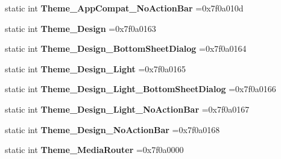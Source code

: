 \begin{DoxyCompactItemize}
static int {\bfseries Theme\+\_\+\+App\+Compat\+\_\+\+No\+Action\+Bar} =0x7f0a010d
\item 
\mbox{\label{classandroid_1_1support_1_1v7_1_1mediarouter_1_1R_1_1style_a616fa0375b1181ab8742cbd2d86d3fe4}} 
static int {\bfseries Theme\+\_\+\+Design} =0x7f0a0163
\item 
\mbox{\label{classandroid_1_1support_1_1v7_1_1mediarouter_1_1R_1_1style_ae04bf3236e19d1abda54c1583a8bc4ea}} 
static int {\bfseries Theme\+\_\+\+Design\+\_\+\+Bottom\+Sheet\+Dialog} =0x7f0a0164
\item 
\mbox{\label{classandroid_1_1support_1_1v7_1_1mediarouter_1_1R_1_1style_a6d96e10781426f8f3e4dc43d48a12cdd}} 
static int {\bfseries Theme\+\_\+\+Design\+\_\+\+Light} =0x7f0a0165
\item 
\mbox{\label{classandroid_1_1support_1_1v7_1_1mediarouter_1_1R_1_1style_aca2b6216f77338f7abd9853734c5081f}} 
static int {\bfseries Theme\+\_\+\+Design\+\_\+\+Light\+\_\+\+Bottom\+Sheet\+Dialog} =0x7f0a0166
\item 
\mbox{\label{classandroid_1_1support_1_1v7_1_1mediarouter_1_1R_1_1style_af98cf7abebb0b451ecc74d268e70dba8}} 
static int {\bfseries Theme\+\_\+\+Design\+\_\+\+Light\+\_\+\+No\+Action\+Bar} =0x7f0a0167
\item 
\mbox{\label{classandroid_1_1support_1_1v7_1_1mediarouter_1_1R_1_1style_afa115a9b4c6de56dee8287642b3482fe}} 
static int {\bfseries Theme\+\_\+\+Design\+\_\+\+No\+Action\+Bar} =0x7f0a0168
\item 
\mbox{\label{classandroid_1_1support_1_1v7_1_1mediarouter_1_1R_1_1style_a27131030e20637f2c38b6d78c3801fea}} 
static int {\bfseries Theme\+\_\+\+Media\+Router} =0x7f0a0000
\item 
\mbox{\label{classandroid_1_1support_1_1v7_1_1mediarouter_1_1R_1_1style_a36d6d10ca8f3eb4436f20b12ecaacbcc}} 

\end{DoxyCompactItemize}
